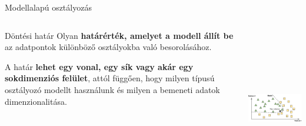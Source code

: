 \documentclass[english, aspectratio=169]{beamer}
\begin{document}
\begin{frame}{Modellalapú osztályozás}
\begin{columns}
\begin{column}{.5\textwidth}
\begin{block}{Döntési határ}
Olyan \textbf{határérték, amelyet a modell állít be} az adatpontok különböző osztályokba való besorolásához.\par\smallskip
A határ \textbf{lehet egy vonal, egy sík vagy akár egy sokdimenziós felület}, attól függően, hogy milyen típusú osztályozó modellt használunk és milyen a bemeneti adatok dimenzionalitása.
\end{block}
\end{column}
\begin{column}{.5\textwidth}
\begin{center}
\includegraphics[width=7cm, height=7cm, keepaspectratio]{images/osztalyozas_6.png}
\end{center}
\end{column}
\end{columns}
\end{frame}
\end{document}
